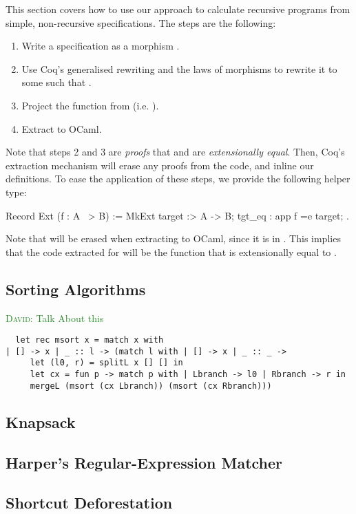 \documentclass[anonymous, a4paper, UKenglish, cleveref, autoref, thm-restate]{lipics-v2021}
\newcommand{\dcas}[1]{\textcolor{ForestGreen}{\textsc{David}: #1}}
\begin{document}
This section covers how to use our approach to calculate recursive programs
from simple, non-recursive specifications. The steps are the following:
\begin{enumerate}
  \item Write a specification as a morphism .
  \item Use Coq's generalised rewriting and the laws of morphisms to 
    rewrite it to some  such that .
  \item Project the function  from 
    (i.e. ).
  \item Extract  to OCaml.
\end{enumerate}
Note that steps 2 and 3 are \emph{proofs} that  and  are
\emph{extensionally equal}. Then, Coq's extraction mechanism will erase any
proofs from the code, and inline our definitions. To ease the application of
these steps, we provide the following helper type:
\begin{coqcode}
  Record Ext (f : A ~> B) := 
    MkExt { target :> A -> B; tgt_eq : app f =e target; }.
\end{coqcode}
Note that  will be erased when extracting  to OCaml,
since it is in . This implies that the code extracted for 
will be the function  that is extensionally equal to .

\subsection{Sorting Algorithms}
\dcas{Talk About this}
\begin{verbatim}
  let rec msort x = match x with
| [] -> x | _ :: l -> (match l with | [] -> x | _ :: _ ->
     let (l0, r) = splitL x [] [] in
     let cx = fun p -> match p with | Lbranch -> l0 | Rbranch -> r in
     mergeL (msort (cx Lbranch)) (msort (cx Rbranch)))
\end{verbatim}

\subsection{Knapsack}

\subsection{Harper's Regular-Expression Matcher}

\subsection{Shortcut Deforestation}
\end{document}
